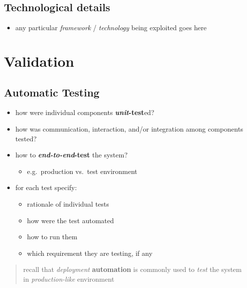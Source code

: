\documentclass{scrartcl}
\begin{document}
\subsection{Technological details}\label{technological-details}

\begin{itemize}
  \item any particular \emph{framework} / \emph{technology} being exploited goes here
\end{itemize}

\section{Validation}\label{validation}

\subsection{Automatic Testing}\label{automatic-testing}

\begin{itemize}
  \item how were individual components \textbf{\emph{unit}-test}ed?
  
  \item how was communication, interaction, and/or integration among components tested?
  
  \item how to \textbf{\emph{end-to-end}-test} the system?
  \begin{itemize}
    \item e.g.~production vs.~test environment
  \end{itemize}

  \item for each test specify:
  \begin{itemize}
    \item rationale of individual tests
    \item how were the test automated
    \item how to run them
    \item which requirement they are testing, if any
  \end{itemize}
\end{itemize}

\begin{quote}
recall that \emph{deployment} \textbf{automation} is commonly used to \emph{test} the system in \emph{production-like} environment
\end{quote}
\end{document}
